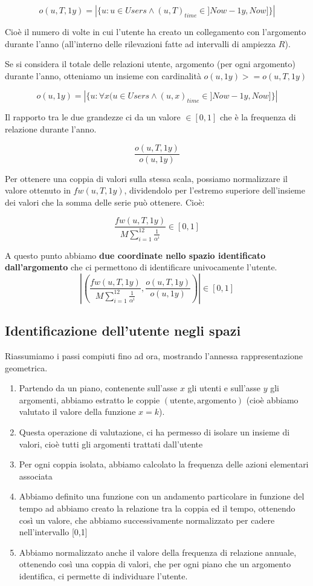 {$$ o(u,T,1y) = |\{u : u \in Users \land (u,T)_{time} \in ]Now-1y,Now]\}| $$

Cioè il numero di volte in cui l'utente ha creato un collegamento con l'argomento durante l'anno (all'interno delle rilevazioni fatte ad intervalli di ampiezza $R$).

Se si considera il totale delle relazioni utente, argomento (per ogni argomento) durante l'anno, otteniamo un insieme con cardinalità $o(u, 1y) >= o(u,T,1y)$

$$ o(u, 1y) = |\{u : \forall x(u \in Users \land (u,x)_{time} \in ]Now-1y, Now]\}|$$

Il rapporto tra le due grandezze ci da un valore $\in [0,1]$ che è la frequenza di relazione durante l'anno.

$$ \frac{o(u,T,1y)}{o(u,1y)} $$

Per ottenere una coppia di valori sulla stessa scala, possiamo normalizzare il valore ottenuto in $fw(u, T, 1y)$, dividendolo per l'estremo superiore dell'insieme dei valori che la somma delle serie può ottenere. Cioè:

$$ \frac{fw(u,T, 1y)}{M\sum\limits_{i=1}^{12}{\frac{1}{\alpha^i}}} \in [0,1]$$

A questo punto abbiamo \textbf{due coordinate nello spazio identificato dall'argomento} che ci permettono di identificare univocamente l'utente.
$$ \left|\left(\frac{fw(u,T, 1y)}{M\sum\limits_{i=1}^{12}{\frac{1}{\alpha^i}}}, \frac{o(u,T,1y)}{o(u,1y)} \right)\right| \in [0,1]$$

\subsection{Identificazione dell'utente negli spazi}
Riassumiamo i passi compiuti fino ad ora, mostrando l'annessa rappresentazione geometrica.

\begin{enumerate}
    \item Partendo da un piano, contenente sull'asse $x$ gli utenti e sull'asse $y$ gli argomenti, abbiamo estratto le coppie $(\text{utente}, \text{argomento})$ (cioè abbiamo valutato il valore della funzione $x = k$).
    \item Questa operazione di valutazione, ci ha permesso di isolare un insieme di valori, cioè tutti gli argomenti trattati dall'utente
    \item Per ogni coppia isolata, abbiamo calcolato la frequenza delle azioni elementari associata
    \item Abbiamo definito una funzione con un andamento particolare in funzione del tempo ad abbiamo creato la relazione tra la coppia ed il tempo, ottenendo così un valore, che abbiamo successivamente normalizzato per cadere nell'intervallo [0,1]
    \item Abbiamo normalizzato anche il valore della frequenza di relazione annuale, ottenendo così una coppia di valori, che per ogni piano che un argomento identifica, ci permette di individuare l'utente.
\end{enumerate}

}
